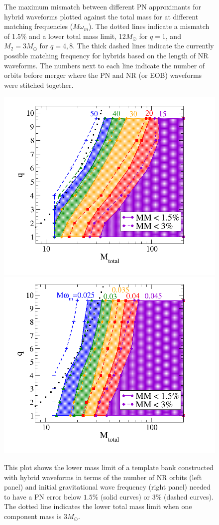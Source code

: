 \begin{figure}
\begin{center}
\end{center}
\caption{\label{fig:maxmismatchVSmass} The maximum mismatch between
  different PN approximants for hybrid waveforms plotted against the
  total mass for at different matching frequencies ($M\omega_m$). The
  dotted lines indicate a mismatch of 1.5\% and a lower total mass
  limit, 12$M_\odot$ for $q=1$, and $M_2 = 3M_\odot$ for $q =
  4,8$. The thick dashed lines indicate the currently possible  
  matching frequency for hybrids based on the length of NR
  waveforms. The numbers next to each line indicate the number of
  orbits before merger where the PN and NR (or EOB) waveforms were 
  stitched together.} 
\end{figure}

\begin{figure}
\begin{center}
\includegraphics[width=0.7\columnwidth]{figures/nrhybbank/NRorbits2merger_cropped.png}
\includegraphics[width=0.7\columnwidth]{figures/nrhybbank/NRomega_cropped.png}
\caption{\label{fig:NRorbits2merger} This plot shows the lower mass limit
  of a template bank constructed with hybrid waveforms in terms of the
number of NR orbits (left panel) and initial gravitational wave
frequency (right panel) needed to have a PN error below $1.5\%$ (solid
curves) or $3\%$ (dashed curves). The dotted line indicates the
lower total mass limit when one component mass is $3M_\odot$.}
\end{center}
\end{figure}

